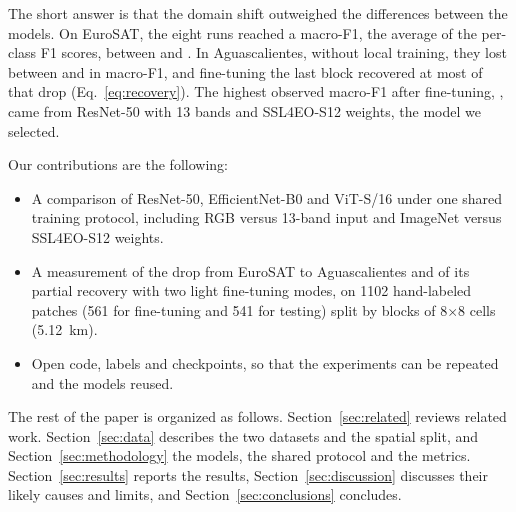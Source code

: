The short answer is that the domain shift outweighed the differences between the models. On
EuroSAT, the eight runs reached a macro-F1, the average of the per-class F1 scores, between
\EuroSATMin{} and \EuroSATMax. In Aguascalientes, without local training, they lost between
\DropMin{} and \DropMax{} in macro-F1, and fine-tuning the last block recovered at most
\RecoveryMax{} of that drop (Eq.~\ref{eq:recovery}). The highest observed macro-F1 after fine-tuning,
\AgsLastBlockBest, came from ResNet-50 with 13 bands and SSL4EO-S12 weights, the model we
selected.

Our contributions are the following:
\begin{itemize}
  \item A comparison of ResNet-50, EfficientNet-B0 and ViT-S/16 under one shared training
  protocol, including RGB versus 13-band input and ImageNet versus SSL4EO-S12 weights.
  \item A measurement of the drop from EuroSAT to Aguascalientes and of its partial recovery
  with two light fine-tuning modes, on \num{1102} hand-labeled patches (561 for fine-tuning and
  541 for testing) split by blocks of 8$\times$8 cells (5.12~km).
  \item Open code, labels and checkpoints, so that the experiments can be repeated and the
  models reused.
\end{itemize}

The rest of the paper is organized as follows. Section~\ref{sec:related} reviews related work.
Section~\ref{sec:data} describes the two datasets and the spatial split, and
Section~\ref{sec:methodology} the models, the shared protocol and the metrics.
Section~\ref{sec:results} reports the results, Section~\ref{sec:discussion} discusses their
likely causes and limits, and Section~\ref{sec:conclusions} concludes.
